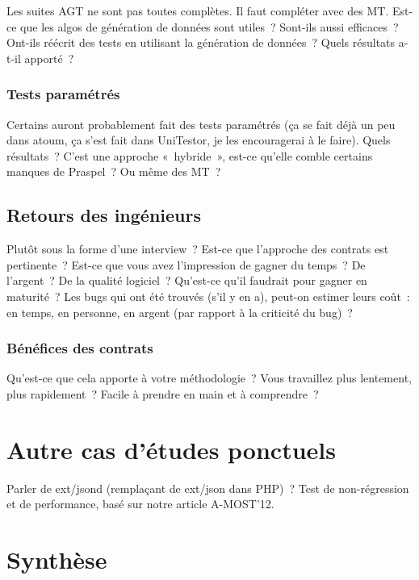 Les suites AGT ne sont pas toutes complètes. Il faut compléter avec des MT.
Est-ce que les algos de génération de données sont utiles~? Sont-ils aussi
efficaces~? Ont-ils réécrit des tests en utilisant la génération de données~?
Quels résultats a-t-il apporté~?

\subsubsection{Tests paramétrés}

Certains auront probablement fait des tests paramétrés (ça se fait déjà un peu
dans atoum, ça s'est fait dans UniTestor, je les encouragerai à le faire). Quels
résultats~? C'est une approche «~hybride~», est-ce qu'elle comble certains
manques de Praspel~? Ou même des MT~?

\subsection{Retours des ingénieurs}

Plutôt sous la forme d'une interview~? Est-ce que l'approche des contrats est
pertinente~? Est-ce que vous avez l'impression de gagner du temps~? De
l'argent~? De la qualité logiciel~? Qu'est-ce qu'il faudrait pour gagner en
maturité~? Les bugs qui ont été trouvés (s'il y en a), peut-on estimer leurs
coût~: en temps, en personne, en argent (par rapport à la criticité du bug)~?

\subsubsection{Bénéfices des contrats}

Qu'est-ce que cela apporte à votre méthodologie~? Vous travaillez plus
lentement, plus rapidement~? Facile à prendre en main et à comprendre~?

\section{Autre cas d'études ponctuels}

Parler de ext/jsond (remplaçant de ext/json dans PHP)~? Test de non-régression
et de performance, basé sur notre article A-MOST'12.

\section{Synthèse}
\label{section:experimentation:other}
